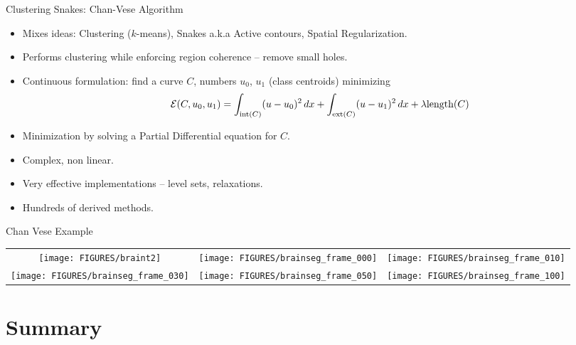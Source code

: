 \documentclass[9pt]{beamer}
\begin{document}
\begin{frame}[t]{Clustering Snakes: Chan-Vese Algorithm}
  \begin{itemize}
  \item Mixes ideas: Clustering ($k$-means), Snakes a.k.a Active contours, Spatial Regularization.
  \item Performs clustering while enforcing region coherence -- remove small holes.\vfill
  \item Continuous formulation: find a curve $C$, numbers $u_0$, $u_1$ (class centroids)  minimizing
    $$
    {\mathcal E}(C,u_0,u_1) = \int_{\text{int}(C)}(u-u_0)^2\,dx + \int_{\text{ext}(C)}(u-u_1)^2\,dx +  \lambda\text{length}(C) 
    $$\vfill
  \item Minimization by solving a Partial Differential equation for $C$.\vfill
  \item Complex, non linear.\vfill
  \item Very effective implementations -- level sets, relaxations.\vfill
  \item Hundreds of derived methods.\vfill
  \end{itemize}
\end{frame}


\begin{frame}[t]{Chan Vese Example}
  \begin{center}
    \begin{tabular}[h]{ccc}
      \texttt{[image: FIGURES/braint2]} & 
      \texttt{[image: FIGURES/brainseg\_frame\_000]} &
      \texttt{[image: FIGURES/brainseg\_frame\_010]}\\
      \texttt{[image: FIGURES/brainseg\_frame\_030]} &
      \texttt{[image: FIGURES/brainseg\_frame\_050]} &
      \texttt{[image: FIGURES/brainseg\_frame\_100]}
    \end{tabular}
  \end{center}
\end{frame}



\section{Summary}
\end{document}
